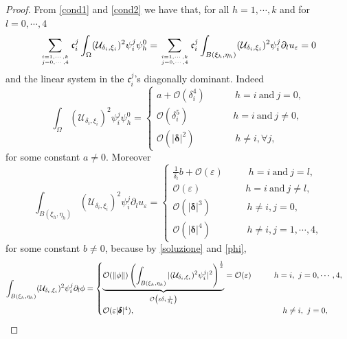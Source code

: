 \documentclass[11pt,a4paper]{amsart}
\newcommand{\e}{\varepsilon}
\renewcommand{\d }{\delta }
\newcommand{\Ui}{{\mathcal{U}_{\delta_i, \xi_i}}}
\theoremstyle{definition}
\renewcommand{\(}{\left(}
\renewcommand{\)}{\right)}
\begin{document}
\begin{proof}
From \eqref{cond1} and \eqref{cond2} we have that, for all $h=1, \cdots, k$ and for $l=0, \cdots, 4$
\begin{equation*}
\sum_{i=1, \cdots, k  \atop j=0, \cdots, 4}  \mathfrak c^j_i \int_{\Omega} (\Ui)^{2} \psi^{j}_{i} \psi^{0}_{h} = \sum_{i=1, \cdots, k  \atop j=0, \cdots, 4} \mathfrak c^j_i  \int_{B(\xi_{h}, \eta_{h})} (\Ui)^{2} \psi^{j}_{i} \partial_{l} u_{\e} = 0 
\end{equation*}
and the linear system in the $ \mathfrak c^j_i$'s diagonally dominant. Indeed
\begin{equation}\label{Sprimo}
\int_{\Omega} (\Ui)^{2} \psi^{j}_{i} \psi^{0}_{h} = 
\begin{cases}
a + \mathcal{O}(\d_i^4) \ \ \ \ \ \ \ \ \ \ \ \ \ \ h=i \ \mbox{and} \ j=0, \\
\mathcal{O}(\d_i^5) \ \ \ \ \ \ \ \ \ \ \ \ \ \ \ \ \ \ \ \ \ h=i \ \mbox{and} \ j \neq 0, \\
\mathcal{O}(|\pmb \d|^2) \ \ \ \ \ \ \ \ \ \ \ \ \ \ \ \ \ \ \ h\neq i, \forall j,
\end{cases}
\end{equation}
for some constant $a \neq 0$.
Moreover
\begin{equation*}
\int_{B(\xi_{h}, \eta_{h})} (\Ui)^{2} \psi^{j}_{i} \partial_{l} u_{\e} =
\begin{cases}
\frac{1}{\d_i} b + \mathcal{O}(\e) \ \ \ \ \ \ \ \ \ \ \ \  h=i \ \mbox{and} \ j=l, \\
\mathcal{O}(\e) \ \ \ \ \ \ \ \ \ \ \ \ \ \ \ \ \ \ \ \ \ h=i \ \mbox{and} \ j \neq l, \\
\mathcal{O}(|\pmb \d|^3) \ \ \ \ \ \ \ \ \ \ \ \ \ \ \ \ \ h\neq i, j =0, \\
\mathcal{O}(|\pmb \d|^4) \ \ \ \ \ \ \ \ \ \ \ \ \ \ \ \ \ h\neq i, j =1, \cdots, 4,
\end{cases}
\end{equation*}
for some constant $b \neq 0$, because by \eqref{soluzione} and \eqref{phi},
\begin{equation*}
\int_{B(\xi_{h}, \eta_{h})} (\Ui)^{2} \psi^{j}_{i} \partial_{l} \phi=
\begin{cases}
\underbrace{\mathcal{O}(\| \phi \|) \left(\int_{B(\xi_{h}, \eta_{h})} |(\Ui)^{2} \psi^{j}_{i}|^{2} \right)^{\frac{1}{2}}}_{\mathcal{O}\left(\e \d_i \frac{1}{\d_i} \right)} = \mathcal{O}(\e) \hspace{1 cm} h=i, \ j=0, \cdots, 4, \\
\mathcal{O}(\e|\pmb \d|^4), \hspace{6.5 cm}  h \neq i, \ j=0,\\

\end{cases}
\end{equation*}
\end{proof}
\end{document}
